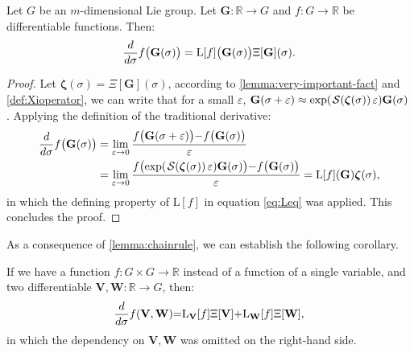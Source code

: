 \begin{lemma}\label{lemma:chainrule}
    Let $G$ be an $m$-dimensional Lie group. Let $\mathbf{G} : \mathbb{R} \to G$ and $f: G \to \mathbb{R}$ be differentiable functions. Then:
    \begin{align}
       \frac{d}{d\sigma} f\bigl(\mathbf{G}(\sigma)\bigr) = \textnormal{L}[f]\bigl(\mathbf{G}(\sigma)\bigr)\Xi[\mathbf{G}](\sigma).
    \end{align}
\end{lemma}
\begin{proof}
    Let $\boldsymbol{\zeta}(\sigma) = \Xi[\mathbf{G}](\sigma)$, according to \cref{lemma:very-important-fact} and \cref{def:Xioperator}, we can write that for a small $\varepsilon$, $\mathbf{G}(\sigma+\varepsilon) \approx \exp(\SL[\boldsymbol{\zeta}(\sigma)]\varepsilon)\mathbf{G}(\sigma)$. 
    Applying the definition of the traditional derivative:
    \begin{align}
        \begin{split}
            \frac{d}{d\sigma} f\bigl(\mathbf{G}(\sigma)\bigr) &= \lim_{\varepsilon \rightarrow 0} \frac{f\bigl(\mathbf{G}(\sigma+\varepsilon)\bigr){-}f\bigl(\mathbf{G}(\sigma)\bigr)}{\varepsilon}\\
            &  =
            \lim_{\varepsilon \rightarrow 0} \frac{f\bigl(\exp(\SL[\boldsymbol{\zeta}(\sigma)]\varepsilon)\mathbf{G}(\sigma)\bigr){-}f\bigl(\mathbf{G}(\sigma)\bigr)}{\varepsilon} = \text{L}[f](\mathbf{G}) \boldsymbol{\zeta}(\sigma),      
        \end{split}
    \end{align}
    in which the defining property of $\text{L}[f]$ in equation \eqref{eq:Leq} was applied. This concludes the proof.
\end{proof}

As a consequence of \cref{lemma:chainrule}, we can establish the following corollary.

\begin{corollary} \label{corol:corol1} If we have a function $f: G \times G \to \mathbb{R}$ instead of a function of a single variable, and two differentiable  $\mathbf{V}, \mathbf{W} : \mathbb{R} \to G$, then:
\begin{equation}
   \frac{d}{d \sigma} f(\mathbf{V},\mathbf{W}) {=} \textnormal{L}_{\mathbf{V}}[f] \Xi[\mathbf{V}] {+} \textnormal{L}_{\mathbf{W}}[f] \Xi[\mathbf{W}],
\end{equation}
in which the dependency on $\mathbf{V}, \mathbf{W}$ was omitted on the right-hand side. 
\end{corollary}

